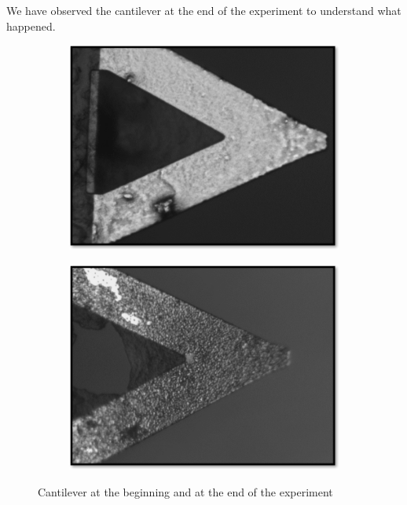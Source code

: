 \documentclass[11pt, a4paper]{article}
\begin{document}
We have observed the cantilever at the end of the experiment to understand what happened. 
\begin{figure}
\centering
	\begin{subfigure}{0.3\linewidth}
		\centering
		\includegraphics[width=1\linewidth]{Cantilever/Can020816_start.png}%
		\caption{}\label{Can020816_start}
	\end{subfigure}
	\begin{subfigure}{0.3\linewidth}
		\centering
		\includegraphics[width=1\linewidth]{Cantilever/Can020816_end.png} %
		\caption{}\label{Can020816_end}
	\end{subfigure}
 \caption{Cantilever at the beginning  and at the end  of the experiment} 
  \end{figure}
\end{document}
